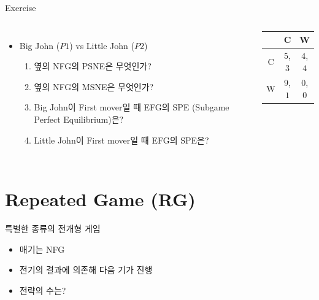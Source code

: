\documentclass[final]{beamer}
\begin{document}
\begin{frame}[t]{Exercise}
	\begin{columns}[c]
		\column{18em}
		\begin{itemize}
			\item Big John ($P1$) vs Little John ($P2$)
			\begin{enumerate}\small
				\item 옆의 NFG의 PSNE은 무엇인가? 
				\item 옆의 NFG의 MSNE은 무엇인가?
				\item Big John이 First mover일 때 EFG의 SPE (Subgame Perfect Equilibrium)은?
				\item Little John이 First mover일 때 EFG의 SPE은?
			\end{enumerate}
		\end{itemize}
		\column{12em}
		\begin{center}
			\begin{table}
				\setlength{\tabcolsep}{1.2em}
				\begin{tabular}{|c|c|c|} \hline
				& {C} &  {W} \\ \hline
				{C} & {$5$}, {$3$} & {$4$}, {$4$} \\ \hline%
				{W} & {$9$}, {$1$}  & {$0$}, {$0$} \\ 
				\hline
				\end{tabular}
			\end{table}
		\end{center}
	\end{columns}
\end{frame}


\section{Repeated Game (RG)} %
\label{sec:repeated_game}

\begin{frame}[t]{특별한 종류의 전개형 게임}
	\begin{itemize}
		\item 매기는 NFG 
		\item 전기의 결과에 의존해 다음 기가 진행 
		\item 전략의 수는? 
	\end{itemize}
	\begin{center}
	\end{center}
\end{frame}
\end{document}
